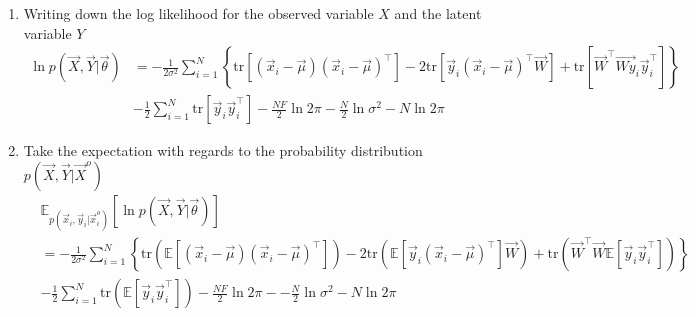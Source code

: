 \documentclass[12pt,twoside]{article}
\begin{document}
\begin{enumerate}
	\item Writing down the log likelihood for the observed variable $X$ and the latent variable $Y$
		\begin{align*}
			\ln p(\vec{X}, \vec{Y} \vert \vec{\theta})
			&= -\frac{1}{2\sigma^2}\sum_{i=1}^N \left\lbrace\text{tr}\left[(\vec{x}_i-\vec{\mu})(\vec{x}_i-\vec{\mu})^\top\right]-  2\text{tr} \left[\vec{y}_i(\vec{x}_i-\vec{\mu})^\top \vec{W}\right]+\text{tr}\left[\vec{W}^\top\vec{Wy}_i\vec{y}_i^\top\right]\right\rbrace\\
			&-\frac{1}{2}\sum_{i=1}^N \text{tr}[\vec{y}_i\vec{y}_i^\top]-\frac{NF}{2} \ln 2\pi - \frac{N}{2} \ln \sigma^2 - N \ln 2\pi
		\end{align*}
	
	\item Take the expectation with regards to the probability distribution $p(\vec{X}, \vec{Y} \vert \vec{X}^o)$
		\begin{align*}
			&\mathbb{E}_{p(\vec{x}_i,\vec{y}_i\vert \vec{x}_i^o)}\left[\ln p(\vec{X}, \vec{Y} \vert \vec{\theta})\right]\\
			&= -\frac{1}{2\sigma^2}\sum_{i=1}^N \left\lbrace\text{tr}\left(\mathbb{E}\left[(\vec{x}_i-\vec{\mu})(\vec{x}_i-\vec{\mu})^\top\right]\right)-  2\text{tr} \left(\mathbb{E}\left[\vec{y}_i(\vec{x}_i-\vec{\mu})^\top\right] \vec{W}\right)+\text{tr}\left(\vec{W}^\top\vec{W}\mathbb{E}\left[\vec{y}_i\vec{y}_i^\top\right]\right)\right\rbrace\\
			&-\frac{1}{2}\sum_{i=1}^N \text{tr}\left(\mathbb{E}\left[\vec{y}_i\vec{y}_i^\top\right]\right)-\frac{NF}{2} \ln 2\pi - - \frac{N}{2} \ln \sigma^2 - N \ln 2\pi
		\end{align*}
		

\end{enumerate}
\end{document}
